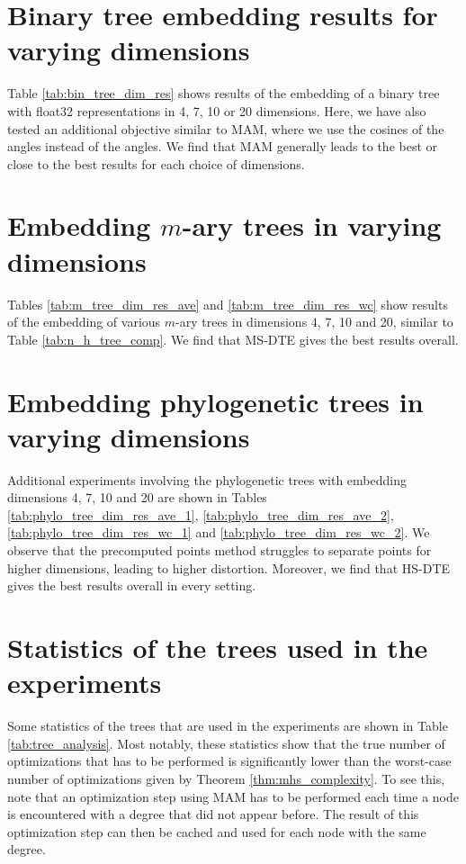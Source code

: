 \section{Binary tree embedding results for varying dimensions}\label{sec:bin_tree_dim_res}
Table \ref{tab:bin_tree_dim_res} shows results of the embedding of a binary tree with float32 representations in 4, 7, 10 or 20 dimensions. Here, we have also tested an additional objective similar to MAM, where we use the cosines of the angles instead of the angles. We find that MAM generally leads to the best or close to the best results for each choice of dimensions.



\section{Embedding \texorpdfstring{$m$}{m}-ary trees in varying dimensions}\label{sec:m_tree_dim_res}
Tables \ref{tab:m_tree_dim_res_ave} and \ref{tab:m_tree_dim_res_wc} show results of the embedding of various $m$-ary trees in dimensions 4, 7, 10 and 20, similar to Table \ref{tab:n_h_tree_comp}. We find that MS-DTE gives the best results overall.



\section{Embedding phylogenetic trees in varying dimensions}\label{sec:phylo_tree_dim_res}
Additional experiments involving the phylogenetic trees with embedding dimensions 4, 7, 10 and 20 are shown in Tables \ref{tab:phylo_tree_dim_res_ave_1}, \ref{tab:phylo_tree_dim_res_ave_2}, \ref{tab:phylo_tree_dim_res_wc_1} and \ref{tab:phylo_tree_dim_res_wc_2}. We observe that the precomputed points method struggles to separate points for higher dimensions, leading to higher distortion. Moreover, we find that HS-DTE gives the best results overall in every setting.

\newpage



\section{Statistics of the trees used in the experiments}\label{sec:tree_analysis}
Some statistics of the trees that are used in the experiments are shown in Table \ref{tab:tree_analysis}. Most notably, these statistics show that the true number of optimizations that has to be performed is significantly lower than the worst-case number of optimizations given by Theorem \ref{thm:mhs_complexity}. To see this, note that an optimization step using MAM has to be performed each time a node is encountered with a degree that did not appear before. The result of this optimization step can then be cached and used for each node with the same degree.

